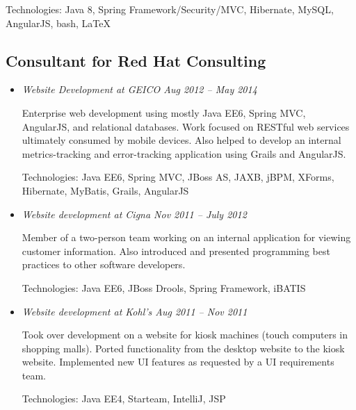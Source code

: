 \documentclass[a4paper,11pt]{article}
\begin{document}
Technologies: Java 8, Spring Framework/Security/MVC, Hibernate, MySQL, AngularJS, bash, \LaTeX

\subsection*{Consultant for Red Hat Consulting}

  \vskip 5pt
  \begin{itemize}

    \item \textit{Website Development at GEICO \hfill Aug 2012 -- May 2014}

      Enterprise web development using mostly Java EE6, Spring MVC, AngularJS, and relational
      databases. Work focused on RESTful web services ultimately consumed by mobile devices. Also
      helped to develop an internal metrics-tracking and error-tracking application using Grails and
      AngularJS.

      Technologies: Java EE6, Spring MVC, JBoss AS, JAXB, jBPM, XForms, Hibernate, MyBatis, Grails,
      AngularJS

%

    \item \textit{Website development at Cigna \hfill Nov 2011 -- July 2012}

      Member of a two-person team working on an internal application for viewing customer
      information. Also introduced and presented programming best practices to other software
      developers.

      Technologies: Java EE6, JBoss Drools, Spring Framework, iBATIS

    \item \textit{Website development at Kohl's \hfill Aug 2011 -- Nov 2011}

      Took over development on a website for kiosk machines (touch computers in shopping
      malls). Ported functionality from the desktop website to the kiosk website. Implemented new UI
      features as requested by a UI requirements team.

      Technologies: Java EE4, Starteam, IntelliJ, JSP

  \end{itemize}
\end{document}
